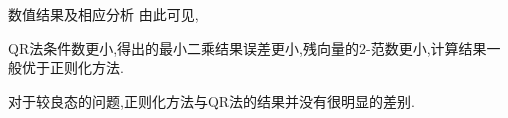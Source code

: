 \documentclass{article}
\begin{document}
\begin{section}{数值结果及相应分析}
    由此可见,
    \begin{compactitem} 
        \item QR法条件数更小,得出的最小二乘结果误差更小,残向量的2-范数更小,计算结果一般优于正则化方法.
        \item 对于较良态的问题,正则化方法与QR法的结果并没有很明显的差别.
    \end{compactitem}
\end{section}
\end{document}
